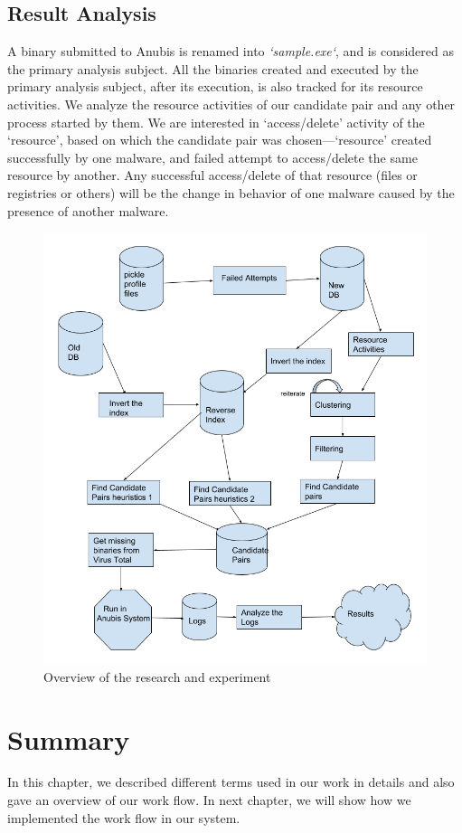 \subsection{Result Analysis}
\label{sub:Result Analysis}
A binary submitted to Anubis is renamed into \emph{`sample.exe`}, and is considered as the primary analysis subject.
All the binaries created and executed by the primary analysis subject, after its execution, is also tracked for its resource activities.
We analyze the resource activities of our candidate pair and any other process started by them.
We are interested in `access/delete' activity of the `resource', based on which the candidate pair was chosen---`resource' created successfully by one malware, and failed attempt to access/delete the same resource by another.
Any successful access/delete of that resource (files or registries or others) will be the change in behavior of one malware caused by the presence of another malware.

\begin{figure}[htbp]
  \centering
  \includegraphics[scale=0.47]{figures/bigpicture.png}
  \caption[Big Picture]{Overview of the research and experiment}\label{fig:bigpicture}
\end{figure}

\section{Summary}
\label{sec:ssummary}
In this chapter, we described different terms used in our work in details and also gave an overview of our work flow.
In next chapter, we will show how we implemented the work flow in our system.
